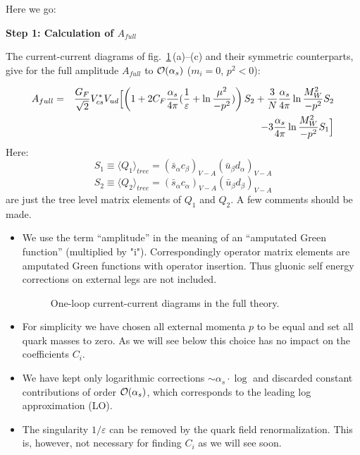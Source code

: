 \documentclass[12pt,rotate]{article}
\def\eps{\varepsilon}
\def\as{\alpha_s}
\newcommand{\ord}{{\cal O}}
\def\aspi{\frac{\as}{4\pi}}
\begin{document}
\begin{itemize}
\begin{itemize}
\begin{itemize}
Here we go:

{\bf Step 1: Calculation of $A_{full}$}

The current-current diagrams of fig.~\ref{L:13}\,(a)--(c) and their
symmetric counterparts,
give for the full amplitude $A_{full}$ to $\ord(\as)$ ($m_i=0$, $p^2<0$):

\begin{eqnarray}\label{amp}
A_{full}
&=&
{G_F\over\sqrt{2}}V^\ast_{cs}V_{ud}
\Bigl[ \left( 1+2C_F \aspi (\frac{1}{\varepsilon}+\ln{\mu^2\over -p^2}) \right)
S_2 +{3\over N}\aspi\ln{M^2_W\over -p^2} S_2
\nonumber\\
& &
-3\aspi\ln{M^2_W\over -p^2} S_1 \Bigr] 
\end{eqnarray}
Here:
\begin{equation}\label{s1c} 
S_1\equiv \langle Q_1\rangle_{tree}=
(\bar s_\alpha c_\beta)_{V-A}(\bar u_\beta d_\alpha)_{V-A}
\end{equation}
\begin{equation}\label{s2c} 
S_2\equiv \langle Q_2\rangle_{tree}=
(\bar s_\alpha c_\alpha)_{V-A}(\bar u_\beta d_\beta)_{V-A}
\end{equation}
are just the tree level matrix elements of $Q_1$ and $Q_2$. A few comments
should be made.
\begin{itemize}
\item
We use the term ``amplitude'' in the meaning of an ``amputated Green
function'' (multiplied by "i"). 
Correspondingly operator matrix elements are
amputated Green functions with operator
insertion. Thus gluonic self energy
corrections on external legs are not included.
\begin{figure}[hbt]
\vspace{0.10in}
\centerline{
\epsfysize=1.25in
}%
\vspace{0.08in}
\caption[]{One-loop current-current 
diagrams in the full theory.
\label{L:13}}
\end{figure}
\item
For simplicity we have chosen all external momenta $p$ to be equal
and set all quark masses to zero. As we will see below this choice
has no impact on the coefficients $C_i$.
\item
We have kept only logarithmic corrections
$\sim\as\cdot\log$ and discarded constant contributions of order
$\ord(\as)$, which corresponds to the leading log approximation (LO).
\item
The singularity $1/\eps$ can be removed by the quark field renormalization.
This is, however, not necessary for finding $C_i$ as we will see soon.
\end{itemize}


\end{itemize}
\end{itemize}
\end{itemize}
\end{document}
